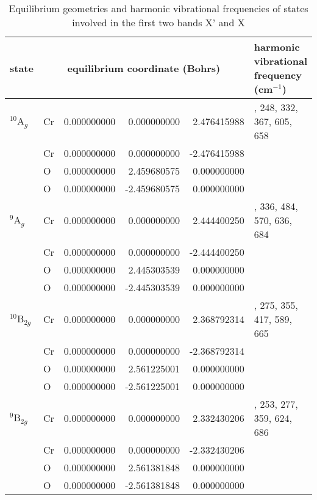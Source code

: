  \begin{landscape}   
    \begin{table}[htbp!]
     \centering
     \caption{Equilibrium geometries and harmonic vibrational frequencies of states involved in the first two bands X' and X}
     \label{a6tbl:fq}
       \begin{tabular}{llrrr>{\centering\arraybackslash}m{6cm}}
       \toprule
       state     & \multicolumn{4}{c}{equilibrium coordinate (Bohrs)} & harmonic vibrational frequency (cm$^{-1}$) \\
       \midrule
       $^{10}$A$_g$  & Cr & 0.000000000 & 0.000000000  & 2.476415988  & 153, 248, 332, 367, 605, 658   \\
                     & Cr & 0.000000000 & 0.000000000  & -2.476415988 &                                                    \\
                     & O  & 0.000000000 & 2.459680575  & 0.000000000  &                                                    \\
                     & O  & 0.000000000 & -2.459680575 & 0.000000000  &                                                    \\
       $^9$A$_g$     & Cr & 0.000000000 & 0.000000000  & 2.444400250  & 143, 336, 484, 570, 636, 684   \\
                     & Cr & 0.000000000 & 0.000000000  & -2.444400250 &                                                    \\
                     & O  & 0.000000000 & 2.445303539  & 0.000000000  &                                                    \\
                     & O  & 0.000000000 & -2.445303539 & 0.000000000  &                                                    \\
     $^{10}$B$_{2g}$ & Cr & 0.000000000 & 0.000000000  & 2.368792314  & 105, 275, 355, 417, 589, 665  \\
                     & Cr & 0.000000000 & 0.000000000  & -2.368792314 &                                                    \\
                     & O  & 0.000000000 & 2.561225001  & 0.000000000  &                                                    \\
                     & O  & 0.000000000 & -2.561225001 & 0.000000000  &                                                    \\
       $^9$B$_{2g}$  & Cr & 0.000000000 & 0.000000000  & 2.332430206  & 153, 253, 277, 359, 624, 686   \\
                     & Cr & 0.000000000 & 0.000000000  & -2.332430206 &                                                    \\
                     & O  & 0.000000000 & 2.561381848  & 0.000000000  &                                                    \\
                     & O  & 0.000000000 & -2.561381848 & 0.000000000  &                                                    \\
       \bottomrule
    \end{tabular}
    \end{table}
\end{landscape}
   

